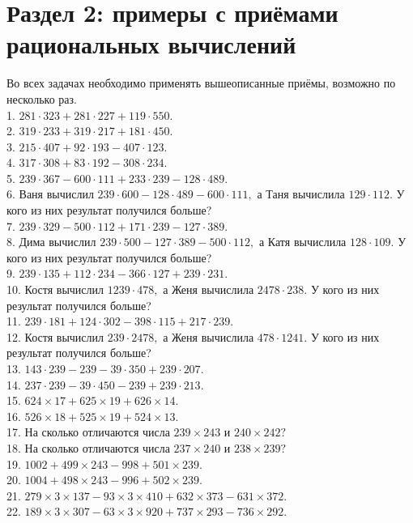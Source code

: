 \section{Раздел 2: примеры с приёмами рациональных вычислений}
Во всех задачах необходимо применять вышеописанные приёмы, возможно по несколько раз.\\
1. $281\cdot323+281\cdot227+119\cdot550.$\\
2. $319\cdot233+319\cdot217+181\cdot450.$\\
3. $215\cdot407+92\cdot193-407\cdot123.$\\
4. $317\cdot308+83\cdot192-308\cdot234.$\\
5. $239\cdot367-600\cdot111+233\cdot239-128\cdot489.$\\
6. Ваня вычислил $239\cdot600-128\cdot489-600\cdot111,$ а Таня вычислила $129\cdot112.$ У кого из них результат получился больше?\\
7. $239\cdot329-500\cdot112+171\cdot239-127\cdot389.$\\
8. Дима вычислил $239\cdot500-127\cdot389-500\cdot112,$ а Катя вычислила $128\cdot109.$ У кого из них результат получился больше?\\
9. $239\cdot135+112\cdot234-366\cdot127+239\cdot231.$\\
10. Костя вычислил $1239\cdot 478,$ а Женя вычислила $2478\cdot238.$ У кого из них результат получился больше?\\
11. $239\cdot181+124\cdot302-398\cdot115+217\cdot239.$\\
12. Костя вычислил $239\cdot2478,$ а Женя вычислила $478\cdot1241.$ У кого из них результат получился больше?\\
13. $143\cdot239-239-39\cdot350+239\cdot207.$\\
14. $237\cdot239-39\cdot450-239+239\cdot213.$\\
15. $624\times17+625\times 19+626\times14.$\\
16. $526\times18+525\times19+524\times13.$\\
17. На сколько отличаются числа $239\times243$ и $240\times242?$\\
18. На сколько отличаются числа $237\times240$ и $238\times239?$\\
19. $1002+499\times243-998+501\times239.$\\
20. $1004+498\times243-996+502\times239.$\\
21. $279\times3\times137-93\times3\times410+632\times373-631\times372.$\\
22. $189\times3\times307-63\times3\times920+737\times293-736\times292.$\\
